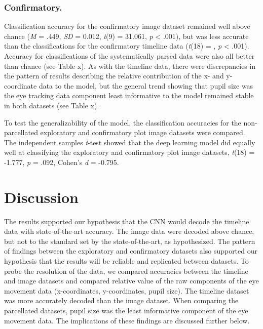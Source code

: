\documentclass[
  english,
  man]{apa6}
\begin{document}
\subsubsection{Confirmatory.}

Classification accuracy for the confirmatory image dataset remained well above chance (\emph{M} = .449, \emph{SD} = 0.012, \emph{t}(9) = 31.061, \emph{p} \textless{} .001), but was less accurate than the classifications for the confirmatory timeline data (\emph{t}(18) = , \emph{p} \textless{} .001). Accuracy for classifications of the systematically parsed data were also all better than chance (see Table x). As with the timeline data, there were discrepancies in the pattern of results describing the relative contribution of the x- and y-coordinate data to the model, but the general trend showing that pupil size was the eye tracking data component least informative to the model remained stable in both datasets (see Table x).

To test the generalizability of the model, the classification accuracies for the non-parcellated exploratory and confirmatory plot image datasets were compared. The independent samples \emph{t}-test showed that the deep learning model did equally well at classifying the exploratory and confirmatory plot image datasets, \emph{t}(18) = -1.777, \emph{p} = .092, Cohen's \emph{d} = -0.795.

\section{Discussion}

The results supported our hypothesis that the CNN would decode the timeline data with state-of-the-art accuracy. The image data were decoded above chance, but not to the standard set by the state-of-the-art, as hypothesized. The pattern of findings between the exploratory and confirmatory datasets also supported our hypothesis that the results will be reliable and replicated between datasets. To probe the resolution of the data, we compared accuracies between the timeline and image datasets and compared relative value of the raw components of the eye movement data (x-coordinates, y-coordinates, pupil size). The timeline dataset was more accurately decoded than the image dataset. When comparing the parcellated datasets, pupil size was the least informative component of the eye movement data. The implications of these findings are discussed further below.
\end{document}
